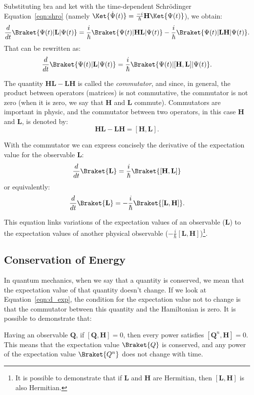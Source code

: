 Substituting bra and ket with the time-dependent Schrödinger Equation~\ref{eqn:shro} (namely $\Ket{\dot{\Psi}(t)} = \frac{- i}{\hbar}\mathbf{H}\Ket{\Psi(t)}$), we obtain:
\[
\frac{d}{dt}\Braket{\Psi(t)|\mathbf{L}|\Psi(t)} = \frac{i}{\hbar}\Braket{\Psi(t)|\mathbf{H}\mathbf{L}|\Psi(t)} - \frac{i}{\hbar} \Braket{\Psi(t)|\mathbf{L}\mathbf{H}|\Psi(t)}.
\]
That can be rewritten as:
\[
\frac{d}{dt}\Braket{\Psi(t)|\mathbf{L}|\Psi(t)} = \frac{i}{\hbar}\Braket{\Psi(t)|[\mathbf{H}, \mathbf{L}]|\Psi(t)}.
\]

The quantity $\mathbf{H}\mathbf{L} - \mathbf{L}\mathbf{H}$ is called the \emph{commutator}, and since, in general, the product between operators (matrices) is not commutative, the commutator is not zero (when it is zero, we say that $\mathbf{H}$ and $\mathbf{L}$ commute). Commutators are important in physic, and the commutator between two operators, in this case $\mathbf{H}$ and $\mathbf{L}$, is denoted by:
\[
\mathbf{H}\mathbf{L} - \mathbf{L}\mathbf{H} = [\mathbf{H},\mathbf{L}].
\]

With the commutator we can express concisely the derivative of the expectation value for the observable $\mathbf{L}$:
\begin{equation}
	\frac{d}{dt} \Braket{\mathbf{L}} = \frac{i}{\hbar}\Braket{[\mathbf{H},\mathbf{L}]}
\end{equation}
or equivalently:
\begin{equation}
	\label{eqn:d_exp}
	\frac{d}{dt} \Braket{\mathbf{L}} = -\frac{i}{\hbar}\Braket{[\mathbf{L},\mathbf{H}]}.
\end{equation}

This equation links variations of the expectation values of an observable ($\mathbf{L}$) to the expectation values of another physical observable  ($-\frac{i}{\hbar}[\mathbf{L},\mathbf{H}]$)\footnote{It is possible to demonstrate that if $\mathbf{L}$ and $\mathbf{H}$ are Hermitian, then $[\mathbf{L}, \mathbf{H}]$ is also Hermitian.}.

\subsection{Conservation of Energy}
In quantum mechanics, when we say that a quantity is conserved, we mean that the expectation value of that quantity doesn't change. If we look at Equation~\ref{eqn:d_exp}, the condition for the expectation value not to change is that the commutator between this quantity and the Hamiltonian is zero. It is possible to demonstrate that:
\begin{theorem}
	Having an observable $\mathbf{Q}$, if $[\mathbf{Q},\mathbf{H}]=0$, then every power satisfies $[\mathbf{Q}^n,\mathbf{H}] = 0$. This means that the expectation value $\Braket{Q}$ is conserved, and any power of the expectation value $\Braket{Q^n}$ does not change with time.
\end{theorem}

